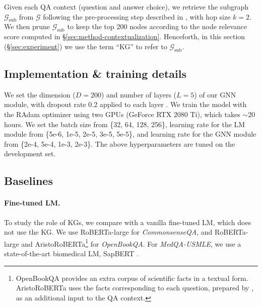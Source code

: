 Given each QA context (question and answer choice), we retrieve the subgraph $\mathcal{G}_\text{sub}$ from $\mathcal{G}$ following the pre-processing step described in \citet{feng2020scalable}, with hop size $k=2$. We then prune $\mathcal{G}_\text{sub}$ to keep the top 200 nodes according to the node relevance score computed in \S \ref{sec:method-contextualization}.
Henceforth, in this section (\S \ref{sec:experiment}) we use the term ``KG'' to refer to $\mathcal{G}_\text{sub}$.




\subsection{Implementation \& training details}
We set the dimension ($D=200$) and number of layers ($L=5$) of our GNN module, with dropout rate
0.2 applied to each layer \cite{srivastava2014dropout}. 
We train the model with the RAdam \cite{liu2019variance} optimizer using two GPUs (GeForce RTX 2080 Ti), which takes $\sim$20 hours.
We set the batch size from \{32, 64, 128, 256\}, learning rate for the LM module from \{5e-6, 1e-5, 2e-5, 3e-5, 5e-5\}, and learning rate for the GNN module from \{2e-4, 5e-4, 1e-3, 2e-3\}. The above hyperparameters are tuned on the development set.


\subsection{Baselines}
\label{sec:experiment-baseline}
\paragraph{Fine-tuned LM.}
To study the role of KGs, we compare with a vanilla fine-tuned LM, which does not use the KG. We use RoBERTa-large \cite{liu2019roberta} for \textit{CommonsenseQA}, and RoBERTa-large and AristoRoBERTa\footnote{OpenBookQA provides an extra corpus of scientific {facts} in a textual form. AristoRoBERTa uses the facts corresponding to each question, prepared by \citet{clark2019f}, as an additional input to the QA context.\vspace{-0mm}} \cite{clark2019f} for \textit{OpenBookQA}.
For \textit{MedQA-USMLE}, we use a state-of-the-art biomedical LM, SapBERT \cite{liu2020self}.


